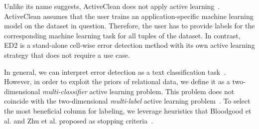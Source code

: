 Unlike its name suggests, ActiveClean does not apply active learning~\cite{krishnan2016activeclean}. ActiveClean assumes that the user trains an application-specific machine learning model on the dataset in question. Therefore, the user has to provide labels for the corresponding machine learning task for all tuples of the dataset. In contrast, ED2 is a stand-alone cell-wise error detection method with its own active learning strategy that does not require a use case.

In general, we can interpret error detection as a text classification task~\cite{tong2001support}. However, in order to exploit the priors of relational data, we define it as a two-dimensional \emph{multi-classifier} active learning problem. This problem does not coincide with the two-dimensional \emph{multi-label} active learning problem~\cite{qi2008two}. To select the most beneficial column for labeling, we leverage heuristics that Bloodgood et al. and Zhu et al. proposed as stopping criteria~\cite{bloodgood2009method, zhu2007active}.

